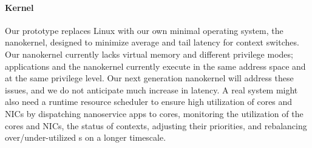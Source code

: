 \paragraph{Kernel} Our prototype replaces Linux with our own minimal operating system, the nanokernel, designed to minimize average and tail latency for context switches. Our nanokernel currently lacks virtual memory and different privilege modes;
applications and the nanokernel currently execute in the same address space and at the same privilege level. Our next generation nanokernel will address these issues, and we do not anticipate much increase in latency. A real system might also need a runtime resource scheduler to ensure high utilization of \name{} cores and NICs by dispatching nanoservice apps to cores, monitoring the utilization of the cores and NICs, the status of contexts, adjusting their priorities, and rebalancing over/under-utilized \name{}s on a longer timescale. 




